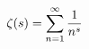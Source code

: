 \documentclass[preview]{standalone}
\begin{document}
\begin{align*}
\special{dvisvgm:raw <g id='unique000'>}\zeta(s) = \sum_{n=1}^{\infty} \frac{1}{n^s}\special{dvisvgm:raw </g>}
\end{align*}
\end{document}
